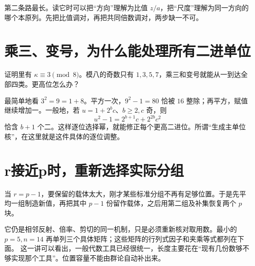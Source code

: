 第二条路最长。读它时可以把“方向”理解为比值 $z/a$，把“尺度”理解为同一方向的哪个本原列。先把比值调对，再把共同倍数调对，两步缺一不可。

\section{乘三、变号，为什么能处理所有二进单位}
证明里有 $\kappa\equiv3\pmod8$。模八的奇数只有 $1,3,5,7$，乘三和变号就能从一到达全部四类。更高位怎么办？

最简单地看 $3^2=9=1+8$。平方一次，$9^2-1=80$ 恰被 $16$ 整除；再平方，赋值继续增加一。一般地，若 $u=1+2^bc$、$b\ge2,c$ 奇，则
\[u^2-1=2^{b+1}c+2^{2b}c^2
\]
恰含 $b+1$ 个二。这样逐位选择幂，就能修正每个更高二进位。所谓“生成主单位核”，在这里就是这件具体的逐位调整。

\section{r接近p时，重新选择实际分组}
当 $r=p-1$，要保留的载体太大，刚才某些标准分组不再有足够位置。于是先平均一组制造新值，再把其中 $p-1$ 份留作载体，之后用第二组及补集恢复两个 $p$ 块。

它仍是相邻反射、倍率、剪切的同一机制，只是必须重新核对取用数。最小的 $p=5,n=14$ 再单列三个具体矩阵；这些矩阵的行列式因子和夹乘等式都列在下面。
这一讲可以看出，一般代数工具已经很统一，长度主要花在“现有几份数够不够实现那个工具”。位置容量不能由群论自动补出来。
